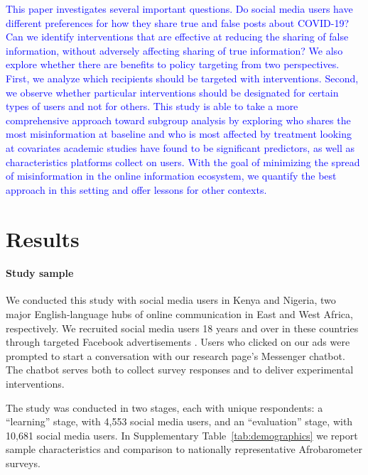 \documentclass[letterpaper, 12pt, parskip=full,DIV=10]{scrartcl}
\begin{document}
\textcolor{blue}{
This paper investigates several important questions.  Do social media users have different preferences for how they share true and false posts about COVID-19? Can we identify interventions that are effective at reducing the sharing of false information, without adversely affecting sharing of true information? We also explore whether there are benefits to policy targeting from two perspectives. First, we analyze which recipients should be targeted with interventions. Second, we observe whether particular interventions should be designated for certain types of users and not for others.  This study is able to take a more comprehensive approach toward subgroup analysis by exploring who shares the most misinformation at baseline and who is most affected by treatment looking at covariates academic studies have found to be significant predictors, as well as characteristics platforms collect on users. With the goal of minimizing the spread of misinformation in the online information ecosystem, we quantify the best approach in this setting and offer lessons for other contexts.}





\section{Results}
\paragraph{Study sample}
We conducted this study with social media users in Kenya and Nigeria, two major English-language hubs of online communication in East and West Africa, respectively. We recruited social media users 18 years and over in these countries through targeted Facebook advertisements \citep[see our advertisement in Figure~\ref{fig:recruitment} in the SI; for further details on targeted recruitment on Facebook, see][]{Rosenzweig_2020}.  Users who clicked on our ads were prompted to start a conversation with our research page's Messenger chatbot. The chatbot serves both to collect survey responses and to deliver experimental interventions. 

The study was conducted in two stages, each with unique respondents: a ``learning'' stage, with 4,553 social media users, and an ``evaluation'' stage, with 10,681 social media users. In Supplementary Table~\ref{tab:demographics} we report sample characteristics and comparison to nationally representative Afrobarometer surveys. 
\end{document}
